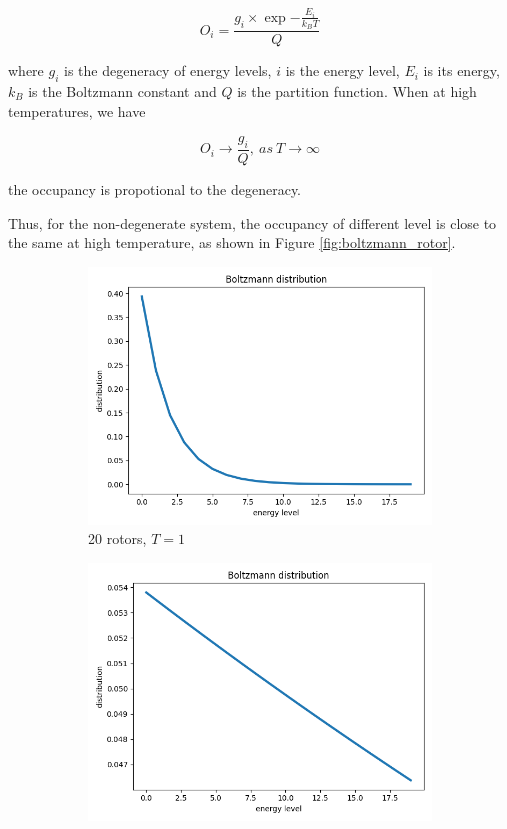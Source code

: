 \documentclass{assignmeownt}
\begin{document}
$$ O_i=\frac{g_i\times \exp{-\frac{E_i}{k_BT}}}{Q}$$

where $g_i$ is the degeneracy of energy levels, $i$ is the energy level, $E_i$ is its energy, $k_B$ is
the Boltzmann constant and $Q$ is the partition function. When at high temperatures, we have

$$ O_i\rightarrow \frac{g_i}{Q},\ as\ T\rightarrow\infty$$

the occupancy is propotional to the degeneracy.

Thus, for the non-degenerate system, the occupancy of different level is close to the same at high temperature, as shown in Figure \ref{fig:boltzmann_rotor}.

\begin{figure}
  \centering
  \begin{subfigure}[b]{0.4\textwidth}
      \centering
      \includegraphics[width=\linewidth]{../block1/2-BoltzmannDistribution/Results/non-degeneracy/20_1.png}
      \caption{20 rotors, $T=1$}
  \end{subfigure}
  \begin{subfigure}[b]{0.4\textwidth}
      \centering
      \includegraphics[width=\linewidth]{../block1/2-BoltzmannDistribution/Results/non-degeneracy/20_64.png}

\end{subfigure}
\end{figure}
\end{document}
